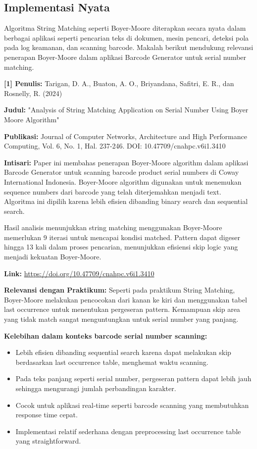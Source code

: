 \subsection{Implementasi Nyata}
Algoritma String Matching seperti Boyer-Moore diterapkan secara nyata dalam berbagai aplikasi seperti pencarian teks di dokumen, mesin pencari, deteksi pola pada log keamanan, dan scanning barcode. Makalah berikut mendukung relevansi penerapan Boyer-Moore dalam aplikasi Barcode Generator untuk serial number matching.

\vspace{1em}
\textbf{[1] Penulis:} Tarigan, D. A., Buaton, A. O., Briyandana, Safitri, E. R., dan Rosnelly, R. (2024)

\textbf{Judul:} "Analysis of String Matching Application on Serial Number Using Boyer Moore Algorithm"

\textbf{Publikasi:} Journal of Computer Networks, Architecture and High Performance Computing, Vol. 6, No. 1, Hal. 237-246. DOI: 10.47709/cnahpc.v6i1.3410

\textbf{Intisari:} Paper ini membahas penerapan Boyer-Moore algorithm dalam aplikasi Barcode Generator untuk scanning barcode product serial numbers di Coway International Indonesia. Boyer-Moore algorithm digunakan untuk menemukan sequence numbers dari barcode yang telah diterjemahkan menjadi text. Algoritma ini dipilih karena lebih efisien dibanding binary search dan sequential search.

Hasil analisis menunjukkan string matching menggunakan Boyer-Moore memerlukan 9 iterasi untuk mencapai kondisi matched. Pattern dapat digeser hingga 13 kali dalam proses pencarian, menunjukkan efisiensi skip logic yang menjadi kekuatan Boyer-Moore.

\textbf{Link:} \url{https://doi.org/10.47709/cnahpc.v6i1.3410}

\vspace{1em}
\textbf{Relevansi dengan Praktikum:} Seperti pada praktikum String Matching, Boyer-Moore melakukan pencocokan dari kanan ke kiri dan menggunakan tabel last occurrence untuk menentukan pergeseran pattern. Kemampuan skip area yang tidak match sangat menguntungkan untuk serial number yang panjang.

\vspace{1em}
\textbf{Kelebihan dalam konteks barcode serial number scanning:}
\begin{itemize}
    \item Lebih efisien dibanding sequential search karena dapat melakukan skip berdasarkan last occurrence table, menghemat waktu scanning.
    \item Pada teks panjang seperti serial number, pergeseran pattern dapat lebih jauh sehingga mengurangi jumlah perbandingan karakter.
    \item Cocok untuk aplikasi real-time seperti barcode scanning yang membutuhkan response time cepat.
    \item Implementasi relatif sederhana dengan preprocessing last occurrence table yang straightforward.
\end{itemize}

